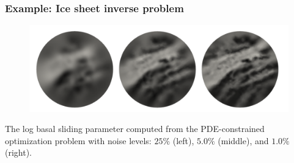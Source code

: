 \documentclass[10pt,final,xcolor=dvipsnames,aspect ratio=169]{beamer}
\begin{document}
\begin{frame}
	\frametitle{Example: Ice sheet inverse problem}
	
	\begin{figure}
		\centering\includegraphics[scale=0.6]{extraplots/reconstructions-ice.png}
	\end{figure}
	\begin{center}
		The log basal sliding parameter computed from the PDE-constrained
		optimization problem with noise levels: $25\%$ (left), $5.0\%$
		(middle), and $1.0\%$ (right).
	\end{center}
\end{frame}
\end{document}
